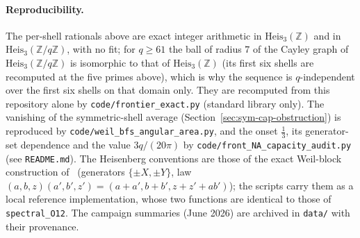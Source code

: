 \documentclass[11pt]{article}
\begin{document}
      \paragraph{Reproducibility.}
      The per-shell rationals above are exact integer arithmetic in $\mathrm{Heis}_3(\mathbb{Z})$ and in
      $\mathrm{Heis}_3(\mathbb{Z}/q\mathbb{Z})$, with no fit; for $q\ge 61$ the ball of radius $7$ of the Cayley graph of
      $\mathrm{Heis}_3(\mathbb{Z}/q\mathbb{Z})$ is isomorphic to that of $\mathrm{Heis}_3(\mathbb{Z})$ (its first six shells are recomputed at the five primes
      above), which is why the sequence is $q$-independent over the first six shells on that domain only.
      They are recomputed from this repository alone by \texttt{code/frontier\_exact.py} (standard library only).
      The vanishing of the symmetric-shell average (Section~\ref{sec:sym-cap-obstruction}) is reproduced by
      \texttt{code/weil\_bfs\_angular\_area.py}, and the onset $\tfrac13$, its generator-set dependence and the
      value $3q/(20\pi)$ by \texttt{code/front\_NA\_capacity\_audit.py} (see \texttt{README.md}).
      The Heisenberg conventions are those of the exact Weil-block construction of~\cite{Beau2026a16}
      (generators $\{\pm X,\pm Y\}$, law $(a,b,z)(a',b',z')=(a+a',b+b',z+z'+ab')$); the scripts carry them as a
      local reference implementation, whose two functions are identical to those of \texttt{spectral\_O12}.
      The campaign summaries (June 2026) are archived in \texttt{data/} with their provenance.

    
    
\end{document}
